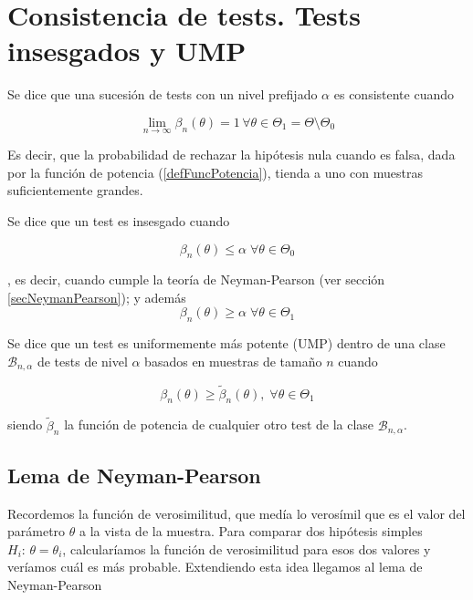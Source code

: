 \documentclass{apuntes}
\begin{document}
\section{Consistencia de tests. Tests insesgados y UMP}

\begin{defn} Se dice que una sucesión de tests con un nivel prefijado $α$ es consistente cuando

\[ \lim_{n\to ∞} β_n(θ) = 1\,∀θ∈Θ_1= Θ\setminus Θ_0 \]

Es decir, que la probabilidad de rechazar la hipótesis nula cuando es falsa, dada por la función de potencia (\ref{defFuncPotencia}), tienda a uno con muestras suficientemente grandes.
\end{defn}


\begin{defn} Se dice que un test es insesgado cuando

\[ β_n(θ)≤α\;∀θ∈Θ_0 \]

, es decir, cuando cumple la teoría de Neyman-Pearson (ver sección \ref{secNeymanPearson}); y además \[ β_n(θ)≥α \;∀θ∈Θ_1 \]

\end{defn}

\begin{defn} Se dice que un test es uniformemente más potente (UMP) dentro de una clase $\mathcal{B}_{n,α}$ de tests de nivel $α$ basados en muestras de tamaño $n$ cuando

\[ β_n(θ) ≥ \tilde{β}_n(θ),\;∀θ∈Θ_1 \]

siendo $\tilde{β}_n$ la función de potencia de cualquier otro test de la clase  $\mathcal{B}_{n,α}$.
\end{defn}

\subsection{Lema de Neyman-Pearson}

Recordemos la función de verosimilitud, que medía lo verosímil que es el valor del parámetro $θ$ a la vista de la muestra. Para comparar dos hipótesis simples $H_i:\,θ=θ_i$, calcularíamos la función de verosimilitud para esos dos valores y veríamos cuál es más probable. Extendiendo esta idea llegamos al lema de Neyman-Pearson
\end{document}
